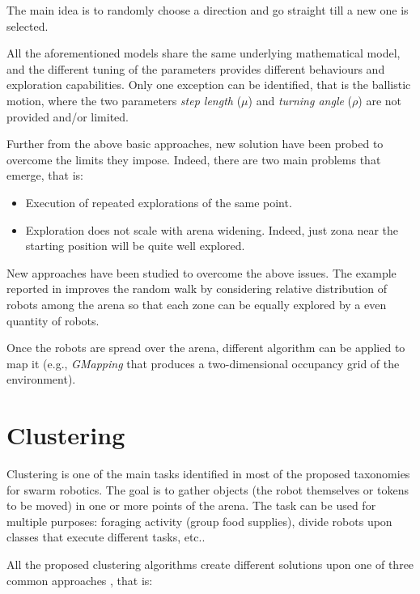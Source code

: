 The main idea is to randomly choose a direction and go straight till a new one is selected.

\noindent
All the aforementioned models share the same underlying mathematical model, and the different tuning of the parameters provides different behaviours and exploration capabilities. Only one exception can be identified, that is the ballistic motion, where the two parameters \textit{step length} ($\mu$) and \textit{turning angle} ($\rho$) are not provided and/or limited. 

\bigskip
Further from the above basic approaches, new solution have been probed to overcome the limits they impose. Indeed, there are two main problems that emerge, that is:

\begin{itemize}

  \item Execution of repeated explorations of the same point.
  \item Exploration does not scale with arena widening. Indeed, just zona near the starting position will be quite well explored.
 
\end{itemize}

New approaches have been studied to overcome the above issues. The example reported in \cite{rw-improved} improves the random walk by considering relative distribution of robots among the arena so that each zone can be equally explored by a even quantity of robots.  

\bigskip
Once the robots are spread over the arena, different algorithm can be applied to map it (e.g., \textit{GMapping} that produces a two-dimensional occupancy grid of the environment). 

\section{Clustering}

Clustering is one of the main tasks identified in most of the proposed taxonomies for swarm robotics. The goal is to gather objects (the robot themselves or tokens to be moved) in one or more points of the arena. The task can be used for multiple purposes: foraging activity (group food supplies), divide robots upon classes that execute different tasks, etc..

\noindent
All the proposed clustering algorithms create different solutions upon one of three common approaches \cite{clustering-summary}, that is:

